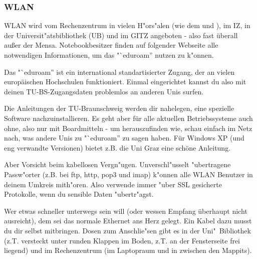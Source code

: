 \subsubsection{WLAN}
\label{wlan}
WLAN wird vom Rechenzentrum in vielen H"ors"alen (wie dem  und
), im IZ, in der Universit"atsbibliothek (UB) und im GITZ angeboten - 
also fast überall außer der Mensa.
Notebookbesitzer finden auf folgender Webseite alle notwendigen Informationen, um 
das "`eduroam'' nutzen zu k"onnen.

Das "`eduroam'' ist ein international standartisierter Zugang, der an vielen 
europäischen Hochschulen funktioniert. Einmal eingerichtet kannst du also mit 
deinen TU-BS-Zugangsdaten problemlos an anderen Unis surfen.

Die Anleitungen der TU-Braunschweig werden dir nahelegen, eine spezielle Software 
nachzuinstallieren. Es geht aber für alle aktuellen Betriebssysteme auch ohne, also nur mit 
Boardmitteln - um herauszufinden wie, schau einfach im Netz nach, was andere 
Unis zu "`eduroam'' zu sagen haben. Für Windows XP (und eng verwandte Versionen) 
bietet z.B. die Uni Graz eine schöne Anleitung.

Aber Vorsicht beim kabellosen Vergn"ugen. Unverschl"usselt "ubertragene
Passw"orter (z.B. bei ftp, http, pop3 und imap) k"onnen alle WLAN
Benutzer in deinem Umkreis mith"oren. Also verwende immer "uber SSL
gesicherte Protokolle, wenn du sensible Daten "ubertr"agst.

Wer etwas schneller unterwegs sein will (oder wessen Empfang überhaupt 
nicht ausreicht), dem sei das normale Ethernet ans
Herz gelegt. Ein Kabel dazu musst du dir selbst mitbringen. Dosen zum
Anschlie"sen gibt es in der Uni"~Bibliothek (z.T. versteckt unter runden
Klappen im Boden, z.T. an der Fensterseite frei liegend) und im
Rechenzentrum (im Laptopraum  und in  zwischen den
Mappits).

